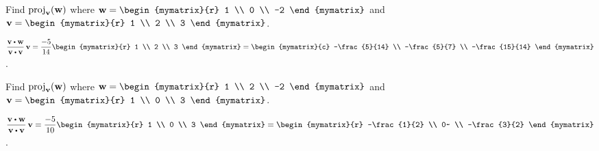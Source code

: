 \begin{ex}
  Find $\proj_{\vect{v}}(\vect{w}) $ where
  $\vect{w}=\begin{mymatrix}{r}
    1 \\
    0 \\
    -2
  \end{mymatrix}$ and $\vect{v}=\begin{mymatrix}{r}
    1 \\
    2 \\
    3
  \end{mymatrix}$.
  \begin{sol}
    $\displaystyle
    \def\arraystretch{1.2}
    \frac{\vect{v}\dotprod \vect{w}}{\vect{v}\dotprod
      \vect{v}}\,\vect{v}=\frac{-5}{14}\begin{mymatrix}{r}
      1 \\
      2 \\
      3
    \end{mymatrix} =\begin{mymatrix}{c}
      -\frac{5}{14} \\
      -\frac{5}{7} \\
      -\frac{15}{14}
    \end{mymatrix}$.
  \end{sol}
\end{ex}

\begin{ex}
  Find $\proj_{\vect{v}}(\vect{w})$ where
  $\vect{w}=\begin{mymatrix}{r}
    1 \\
    2 \\
    -2
  \end{mymatrix} $ and $\vect{v}=\begin{mymatrix}{r}
    1 \\
    0 \\
    3
  \end{mymatrix}$.
  \begin{sol}
    $\displaystyle
    \def\arraystretch{1.2}
    \frac{\vect{v}\dotprod \vect{w}}{\vect{v}\dotprod
      \vect{v}}\,\vect{v}=\frac{-5}{10}\begin{mymatrix}{r}
      1 \\
      0 \\
      3
    \end{mymatrix} =\begin{mymatrix}{r}
      -\frac{1}{2} \\
      0~ \\
      -\frac{3}{2}
    \end{mymatrix}$.
  \end{sol}
\end{ex}

